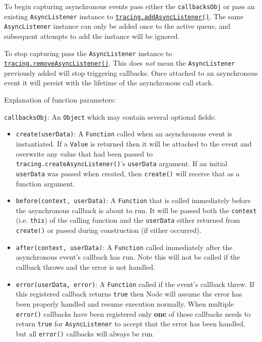 To begin capturing asynchronous events pass either the
\texttt{callbacksObj} or pass an existing \texttt{AsyncListener}
instance to
\hyperref[tracingux5ftracingux5faddasynclistenerux5fasynclistener]{\texttt{tracing.addAsyncListener()}}.
The same \texttt{AsyncListener} instance can only be added once to the
active queue, and subsequent attempts to add the instance will be
ignored.

To stop capturing pass the \texttt{AsyncListener} instance to
\hyperref[tracingux5ftracingux5fremoveasynclistenerux5fasynclistener]{\texttt{tracing.removeAsyncListener()}}.
This does \emph{not} mean the \texttt{AsyncListener} previously added
will stop triggering callbacks. Once attached to an asynchronous event
it will persist with the lifetime of the asynchronous call stack.

Explanation of function parameters:

\texttt{callbacksObj}: An \texttt{Object} which may contain several
optional fields:

\begin{itemize}
\item
  \texttt{create(userData)}: A \texttt{Function} called when an
  asynchronous event is instantiated. If a \texttt{Value} is returned
  then it will be attached to the event and overwrite any value that had
  been passed to \texttt{tracing.createAsyncListener()}'s
  \texttt{userData} argument. If an initial \texttt{userData} was passed
  when created, then \texttt{create()} will receive that as a function
  argument.
\item
  \texttt{before(context,\ userData)}: A \texttt{Function} that is
  called immediately before the asynchronous callback is about to run.
  It will be passed both the \texttt{context} (i.e. \texttt{this}) of
  the calling function and the \texttt{userData} either returned from
  \texttt{create()} or passed during construction (if either occurred).
\item
  \texttt{after(context,\ userData)}: A \texttt{Function} called
  immediately after the asynchronous event's callback has run. Note this
  will not be called if the callback throws and the error is not
  handled.
\item
  \texttt{error(userData,\ error)}: A \texttt{Function} called if the
  event's callback threw. If this registered callback returns
  \texttt{true} then Node will assume the error has been properly
  handled and resume execution normally. When multiple \texttt{error()}
  callbacks have been registered only \textbf{one} of those callbacks
  needs to return \texttt{true} for \texttt{AsyncListener} to accept
  that the error has been handled, but all \texttt{error()} callbacks
  will always be run.
\end{itemize}

